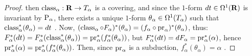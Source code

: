 \begin{proof}
  then $\operatorname{class}_\alpha : {\mathbf R} \to T_\alpha$ is a covering,
  and since the $1$-form $dt \in \Omega^1({\mathbf R})$ is invariant by ${\operatorname{P}}_\alpha$,
  there exists a unique $1$-form $\theta_\alpha \in \Omega^1(T_\alpha)$ such that $\operatorname{class}_\alpha^*(\theta_\alpha) = dt$ .
  Now,
  $(\operatorname{class}_\alpha \circ F_\alpha)^*(\theta_\alpha) = (f_\alpha \circ \mathrm{pr}_\alpha)^*(\theta_\alpha)$,
  thus:
  $F_\alpha^*(dt) = F_\alpha^*(\operatorname{class}_\alpha^*(\theta_\alpha)) = \mathrm{pr}_\alpha^*(f_\alpha^*(\theta_\alpha))$,
  but $F_\alpha^*(dt) = dF_\alpha = \mathrm{pr}_\alpha^*(\alpha)$,
  hence $\mathrm{pr}_\alpha^*(\alpha) = \mathrm{pr}_\alpha^*(f_\alpha^*(\theta_\alpha))$.
  Then,
  since $\mathrm{pr}_\alpha$ is a subduction, $f_\alpha^*(\theta_\alpha) = \alpha$ .
\end{proof}

